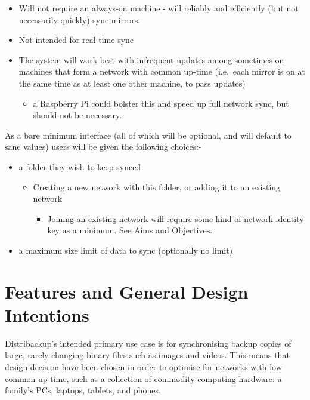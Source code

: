 \documentclass[12pt,a4paper,]{adreport}
\begin{document}
\begin{itemize}
\itemsep1pt\parskip0pt
\item
  Will not require an always-on machine - will reliably and efficiently
  (but not necessarily quickly) sync mirrors.
\item
  Not intended for real-time sync
\item
  The system will work best with infrequent updates among sometimes-on
  machines that form a network with common up-time (i.e.~each mirror is
  on at the same time as at least one other machine, to pass updates)

  \begin{itemize}
  \itemsep1pt\parskip0pt
  \item
    a Raspberry Pi could bolster this and speed up full network sync,
    but should not be necessary.
  \end{itemize}
\end{itemize}

As a bare minimum interface (all of which will be optional, and will
default to sane values) users will be given the following choices:-

\begin{itemize}
\itemsep1pt\parskip0pt
\item
  a folder they wish to keep synced

  \begin{itemize}
  \itemsep1pt\parskip0pt
  \item
    Creating a new network with this folder, or adding it to an existing
    network

    \begin{itemize}
    \itemsep1pt\parskip0pt
    \item
      Joining an existing network will require some kind of network
      identity key as a minimum. See Aims and Objectives.
    \end{itemize}
  \end{itemize}
\item
  a maximum size limit of data to sync (optionally no limit)
\end{itemize}

\section{Features and General Design
Intentions}\label{features-and-general-design-intentions}

Distribackup's intended primary use case is for synchronising backup
copies of large, rarely-changing binary files such as images and videos.
This means that design decision have been chosen in order to optimise
for networks with low common up-time, such as a collection of commodity
computing hardware: a family's PCs, laptops, tablets, and phones.
\end{document}
